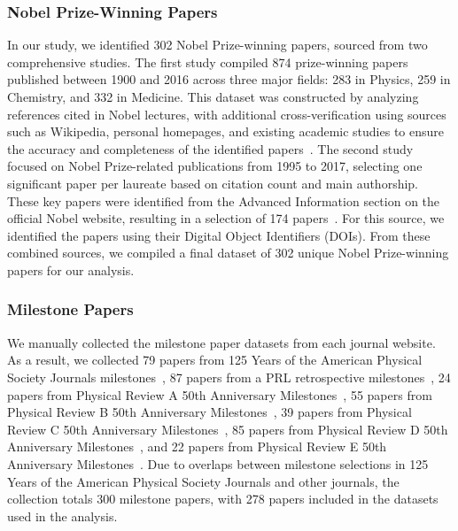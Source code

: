 \documentclass[12pt]{article}
\begin{document}
\begin{refsection}
\subsubsection{Nobel Prize-Winning Papers}
\label{subsec:nobel-prize-winning}


In our study, we identified 302 Nobel Prize-winning papers, sourced from two comprehensive studies. The first study compiled 874 prize-winning papers published between 1900 and 2016 across three major fields: 283 in Physics, 259 in Chemistry, and 332 in Medicine. This dataset was constructed by analyzing references cited in Nobel lectures, with additional cross-verification using sources such as Wikipedia, personal homepages, and existing academic studies to ensure the accuracy and completeness of the identified papers~\cite{DVN/6NJ5RN_2018}. The second study focused on Nobel Prize-related publications from 1995 to 2017, selecting one significant paper per laureate based on citation count and main authorship. These key papers were identified from the Advanced Information section on the official Nobel website, resulting in a selection of 174 papers~\cite{ioannidis2020work}. For this source, we identified the papers using their Digital Object Identifiers (DOIs). From these combined sources, we compiled a final dataset of 302 unique Nobel Prize-winning papers for our analysis.


\subsubsection{Milestone Papers}

We manually collected the milestone paper datasets from each journal website. As a result, we collected 79 papers from 125 Years of the American Physical Society Journals milestones~\cite{APS125Years}, 87 papers from a PRL retrospective milestones~\cite{prl_milestone}, 24 papers from Physical Review A 50th Anniversary Milestones~\cite{pra_milestone}, 55 papers from Physical Review B 50th Anniversary Milestones~\cite{prb_milestone}, 39 papers from Physical Review C 50th Anniversary Milestones~\cite{prc_milestone}, 85 papers from Physical Review D 50th Anniversary Milestones~\cite{prd_milestone}, and 22 papers from Physical Review E 50th Anniversary Milestones~\cite{pre_milestone}. Due to overlaps between milestone selections in 125 Years of the American Physical Society Journals and other journals, the collection totals 300 milestone papers, with 278 papers included in the datasets used in the analysis.



\end{refsection}
\end{document}
